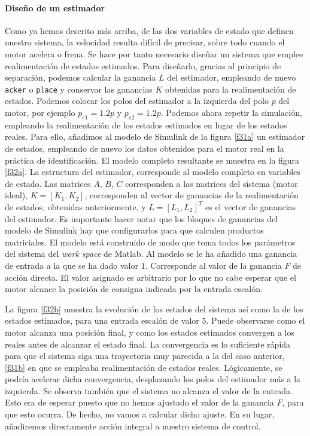 \documentclass[10pt,a4paper]{report}
\begin{document}
\paragraph{Diseño de un  estimador} Como ya hemos descrito más arriba, de las dos variables de estado que definen nuestro sistema, la velocidad resulta difícil de precisar, sobre todo cuando el motor acelera o frena. Se hace por tanto necesario diseñar un sistema que emplee realimentación de estados estimados. Para diseñarlo, gracias al principio de separación, podemos calcular la ganancia $L$ del estimador, empleando de nuevo  \texttt{acker} o \texttt{place} y conservar las ganancias $K$ obtenidas para la realimentación de estados. Podemos colocar los polos del estimador a la izquierda del polo $p$ del motor, por ejemplo $p_{e1} = 1.2p$ y $p_{e2} = 1.2p $. Podemos ahora repetir la simulación, empleando la realimentación de los estados estimados en lugar de los estados reales. Para ello, añadimos al modelo de Simulink de la figura \ref{f31a} un estimador de estados, empleando de nuevo los datos obtenidos para el motor real en la práctica de identificación. El modelo completo resultante se muestra en la figura \ref{f32a}. La estructura del estimador, corresponde al modelo completo en variables de estado. Las matrices $A$, $B$, $C$ corresponden a las matrices del sistema (motor ideal), $K = [K_1,K_2]$, corresponden al vector de ganancias de la realimentación de estados, obtenidas anteriormente, y $L = [L_1,L_2]^T$ es el vector de ganancias del estimador. Es importante hacer notar que los bloques de ganancias del modelo de Simulink hay que configurarlos para que calculen productos matriciales. El modelo está construido de modo que toma todos los parámetros del sistema del \emph{work space} de Matlab. Al modelo se le ha añadido una ganancia de entrada a la que se ha dado valor $1$. Corresponde al valor de la ganancia $F$ de acción directa. El valor asignado es arbitrario por lo que no cabe esperar que el motor alcance la posición de consigna indicada por la entrada escalón. 

La figura \ref{f32b} muestra la evolución de los estados del sistema así como la de los estados estimados, para una entrada escalón de valor 5. Puede observarse como el motor alcanza una posición final, y como los estados estimados convergen a  los reales antes de alcanzar el estado final. La convergencia es lo suficiente rápida para que el sistema siga una trayectoria muy parecida a la del caso anterior, \ref{f31b} en que se empleaba realimentación de estados reales. Lógicamente, se podría acelerar dicha convergencia, desplazando los polos del estimador más a la izquierda. Se observa también que el sistema no alcanza el valor de la entrada. Esto era de esperar puesto que no hemos ajustado el valor de la ganancia $F$, para que esto ocurra. De hecho, no vamos a calcular dicho ajuste. En su lugar, añadiremos directamente acción integral a nuestro sistema de control.
\end{document}
